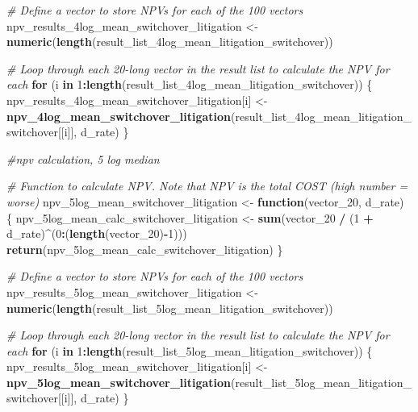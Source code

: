 \documentclass[
]{article}
\newenvironment{Shaded}{\begin{snugshade}}{\end{snugshade}}
\newcommand{\CommentTok}[1]{\textcolor[rgb]{0.56,0.35,0.01}{\textit{#1}}}
\newcommand{\ControlFlowTok}[1]{\textcolor[rgb]{0.13,0.29,0.53}{\textbf{#1}}}
\newcommand{\DecValTok}[1]{\textcolor[rgb]{0.00,0.00,0.81}{#1}}
\newcommand{\FunctionTok}[1]{\textcolor[rgb]{0.13,0.29,0.53}{\textbf{#1}}}
\newcommand{\NormalTok}[1]{#1}
\newcommand{\OtherTok}[1]{\textcolor[rgb]{0.56,0.35,0.01}{#1}}
\newcommand{\SpecialCharTok}[1]{\textcolor[rgb]{0.81,0.36,0.00}{\textbf{#1}}}
\begin{document}
\begin{Shaded}
\begin{Highlighting}[]
\CommentTok{\# Define a vector to store NPVs for each of the 100 vectors}
\NormalTok{npv\_results\_4log\_mean\_switchover\_litigation }\OtherTok{\textless{}{-}} \FunctionTok{numeric}\NormalTok{(}\FunctionTok{length}\NormalTok{(result\_list\_4log\_mean\_litigation\_switchover))}

\CommentTok{\# Loop through each 20{-}long vector in the result list to calculate the NPV for each}
\ControlFlowTok{for}\NormalTok{ (i }\ControlFlowTok{in} \DecValTok{1}\SpecialCharTok{:}\FunctionTok{length}\NormalTok{(result\_list\_4log\_mean\_litigation\_switchover)) \{}
\NormalTok{  npv\_results\_4log\_mean\_switchover\_litigation[i] }\OtherTok{\textless{}{-}} \FunctionTok{npv\_4log\_mean\_switchover\_litigation}\NormalTok{(result\_list\_4log\_mean\_litigation\_switchover[[i]], d\_rate)}
\NormalTok{\}}


\CommentTok{\#npv calculation, 5 log median}


\CommentTok{\# Function to calculate NPV. Note that NPV is the total COST (high number = worse)}
\NormalTok{npv\_5log\_mean\_switchover\_litigation }\OtherTok{\textless{}{-}} \ControlFlowTok{function}\NormalTok{(vector\_20, d\_rate) \{}
\NormalTok{  npv\_5log\_mean\_calc\_switchover\_litigation }\OtherTok{\textless{}{-}} \FunctionTok{sum}\NormalTok{(vector\_20 }\SpecialCharTok{/}\NormalTok{ (}\DecValTok{1} \SpecialCharTok{+}\NormalTok{ d\_rate)}\SpecialCharTok{\^{}}\NormalTok{(}\DecValTok{0}\SpecialCharTok{:}\NormalTok{(}\FunctionTok{length}\NormalTok{(vector\_20)}\SpecialCharTok{{-}}\DecValTok{1}\NormalTok{)))}
  \FunctionTok{return}\NormalTok{(npv\_5log\_mean\_calc\_switchover\_litigation)}
\NormalTok{\}}

\CommentTok{\# Define a vector to store NPVs for each of the 100 vectors}
\NormalTok{npv\_results\_5log\_mean\_switchover\_litigation }\OtherTok{\textless{}{-}} \FunctionTok{numeric}\NormalTok{(}\FunctionTok{length}\NormalTok{(result\_list\_5log\_mean\_litigation\_switchover))}

\CommentTok{\# Loop through each 20{-}long vector in the result list to calculate the NPV for each}
\ControlFlowTok{for}\NormalTok{ (i }\ControlFlowTok{in} \DecValTok{1}\SpecialCharTok{:}\FunctionTok{length}\NormalTok{(result\_list\_5log\_mean\_litigation\_switchover)) \{}
\NormalTok{  npv\_results\_5log\_mean\_switchover\_litigation[i] }\OtherTok{\textless{}{-}} \FunctionTok{npv\_5log\_mean\_switchover\_litigation}\NormalTok{(result\_list\_5log\_mean\_litigation\_switchover[[i]], d\_rate)}
\NormalTok{\}}





\end{Highlighting}
\end{Shaded}
\end{document}
